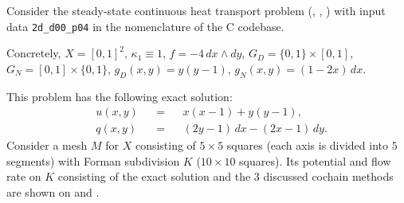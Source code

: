 \begin{example}
  \label{cmc/diffusion/continuous/steady_state/examples/2d_d00_p04-example}
  Consider the steady-state continuous heat transport problem
  (,
   ,
   )
  with input data \verb|2d_d00_p04| in the nomenclature of the C codebase.

  Concretely,
    $X = [0, 1]^2$,
    $\kappa_1 \equiv 1$,
    $f = -4 \, d x \wedge d y$,
    $G_D = \{0, 1\} \times [0, 1]$,
    $G_N = [0, 1] \times \{0, 1\}$,
    $g_D(x, y) = y (y - 1)$,
    $g_N(x, y) = (1 - 2 x) \, d x$.

  This problem has the following exact solution:
  \begin{subequations}
    \begin{alignat}{3}
      & u(x, y) && = && x (x - 1) + y (y - 1), \\
      & q(x, y) && = && (2 y - 1)\, d x - (2 x - 1)\, d y.
    \end{alignat}
  \end{subequations}
  Consider a mesh $M$ for $X$ consisting of $5 \times 5$ squares (each axis is
  divided into $5$ segments) with Forman subdivision $K$
  ($10 \times 10$ squares).
  Its potential and flow rate on $K$ consisting of the exact solution and the
  $3$ discussed cochain methods are shown on
  and
  .
\end{example}

